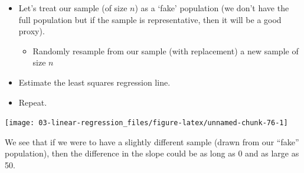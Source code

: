 \documentclass[
]{book}
\newenvironment{Shaded}{\begin{snugshade}}{\end{snugshade}}
\newcommand{\CommentTok}[1]{\textcolor[rgb]{0.56,0.35,0.01}{\textit{#1}}}
\newcommand{\DataTypeTok}[1]{\textcolor[rgb]{0.13,0.29,0.53}{#1}}
\newcommand{\DecValTok}[1]{\textcolor[rgb]{0.00,0.00,0.81}{#1}}
\newcommand{\KeywordTok}[1]{\textcolor[rgb]{0.13,0.29,0.53}{\textbf{#1}}}
\newcommand{\NormalTok}[1]{#1}
\newcommand{\OperatorTok}[1]{\textcolor[rgb]{0.81,0.36,0.00}{\textbf{#1}}}
\newcommand{\OtherTok}[1]{\textcolor[rgb]{0.56,0.35,0.01}{#1}}
\newcommand{\StringTok}[1]{\textcolor[rgb]{0.31,0.60,0.02}{#1}}
\providecommand{\tightlist}{%
  \setlength{\itemsep}{0pt}\setlength{\parskip}{0pt}}
\begin{document}
\begin{itemize}
\tightlist
\item
  Let's treat our sample (of size \(n\)) as a `fake' population (we don't have the full population but if the sample is representative, then it will be a good proxy).

  \begin{itemize}
  \tightlist
  \item
    Randomly resample from our sample (with replacement) a new sample of size \(n\)
  \end{itemize}
\item
  Estimate the least squares regression line.
\item
  Repeat.
\end{itemize}

\begin{Shaded}
\end{Shaded}

\begin{center}\texttt{[image: 03-linear-regression\_files/figure-latex/unnamed-chunk-76-1]} \end{center}

We see that if we were to have a slightly different sample (drawn from our ``fake'' population), then the difference in the slope could be as long as 0 and as large as 50.
\end{document}
